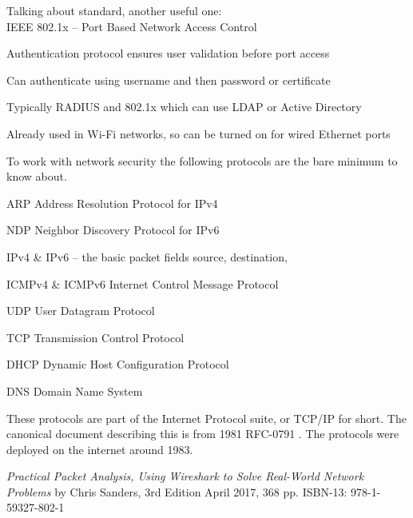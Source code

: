 \documentclass[Screen16to9,17pt]{foils}
\begin{document}
Talking about standard, another useful one:\\
IEEE 802.1x -- Port Based Network Access Control


\begin{list1}
\item Authentication protocol ensures user validation before port access
\item Can authenticate using username and then password or certificate
\item Typically RADIUS and 802.1x which can use LDAP or Active Directory
\item Already used in Wi-Fi networks, so can be turned on for wired Ethernet ports
\end{list1}



To work with network security the following protocols are the bare minimum to know about.

\begin{list2}
\item ARP Address Resolution Protocol for IPv4
\item NDP Neighbor Discovery Protocol for IPv6
\item IPv4 \& IPv6 -- the basic packet fields source, destination,
\item ICMPv4 \& ICMPv6 Internet Control Message Protocol
\item UDP User Datagram Protocol
\item TCP Transmission Control Protocol
\item DHCP Dynamic Host Configuration Protocol
\item DNS Domain Name System
\end{list2}

These protocols are part of the Internet Protocol suite, or TCP/IP for short. The canonical document describing this is from 1981 RFC-0791 . The protocols were deployed on the internet around 1983.




\emph{Practical Packet Analysis,
Using Wireshark to Solve Real-World Network Problems}
by Chris Sanders, 3rd Edition
April 2017, 368 pp.
ISBN-13:
978-1-59327-802-1

\end{document}
